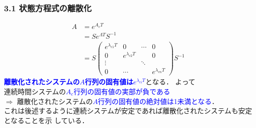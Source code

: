 \documentclass[10pt]{beamer}
\begin{document}
\begin{frame}[t]
\frametitle{3.1 状態方程式の離散化}
\begin{align}
 A &=  e^{A_cT} \nonumber \\
 &= S e^{\Lambda T} S^{-1} \nonumber \\
 &=
  S \left(\begin{array}{cccc}
           e^{\lambda_{c1} T} & 0                  & \cdots & 0 \\
	   0                  & e^{\lambda_{c2} T} &        & 0 \\
	   \vdots             &                    & \ddots & \\
	   0                  & \cdots             & & e^{\lambda_{cn} T}
	  \end{array}\right)
  S^{-1} \tag{3.7}
\end{align}
\textcolor{blue}{\bf 離散化されたシステムの$A$行列の固有値は$e^{\lambda_{ci} T}$}となる．
よって\\
\hspace*{0.5cm}
連続時間システムの\textcolor{blue}{$A_c$行列の固有値の実部が負である}\\
\hspace*{0.5cm}
$\Longrightarrow$ 離散化されたシステムの\textcolor{blue}{$A$行列の固有値の絶対値は1未満となる}．\\
これは後述するように連続システムが安定であれば離散化されたシステムも安定となることを示
している．
\end{frame}
\end{document}
